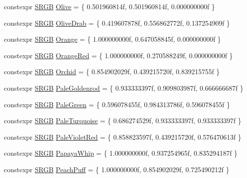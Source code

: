 \begin{DoxyCompactItemize}
\item 
constexpr \hyperlink{structmage_1_1_s_r_g_b}{S\+R\+GB} \hyperlink{namespacemage_1_1color_a7acb7a37c622e61615f548587d6b427c}{Olive} = \{ 0.\+501960814f, 0.\+501960814f, 0.\+000000000f \}
\item 
constexpr \hyperlink{structmage_1_1_s_r_g_b}{S\+R\+GB} \hyperlink{namespacemage_1_1color_a151c92b265a81f3d8dd4eac81dc133ef}{Olive\+Drab} = \{ 0.\+419607878f, 0.\+556862772f, 0.\+137254909f \}
\item 
constexpr \hyperlink{structmage_1_1_s_r_g_b}{S\+R\+GB} \hyperlink{namespacemage_1_1color_aabcf43da8629ad2e50ccc9d89825e52f}{Orange} = \{ 1.\+000000000f, 0.\+647058845f, 0.\+000000000f \}
\item 
constexpr \hyperlink{structmage_1_1_s_r_g_b}{S\+R\+GB} \hyperlink{namespacemage_1_1color_a45f7b1033b0d4f2eda6a0b2e9bbdc203}{Orange\+Red} = \{ 1.\+000000000f, 0.\+270588249f, 0.\+000000000f \}
\item 
constexpr \hyperlink{structmage_1_1_s_r_g_b}{S\+R\+GB} \hyperlink{namespacemage_1_1color_af52662e157e6674b473007146e3c40f6}{Orchid} = \{ 0.\+854902029f, 0.\+439215720f, 0.\+839215755f \}
\item 
constexpr \hyperlink{structmage_1_1_s_r_g_b}{S\+R\+GB} \hyperlink{namespacemage_1_1color_a493db5a4fbb51a82bd265f376c6a5e7e}{Pale\+Goldenrod} = \{ 0.\+933333397f, 0.\+909803987f, 0.\+666666687f \}
\item 
constexpr \hyperlink{structmage_1_1_s_r_g_b}{S\+R\+GB} \hyperlink{namespacemage_1_1color_a14c756d3d980a36599956a1f8f208dd3}{Pale\+Green} = \{ 0.\+596078455f, 0.\+984313786f, 0.\+596078455f \}
\item 
constexpr \hyperlink{structmage_1_1_s_r_g_b}{S\+R\+GB} \hyperlink{namespacemage_1_1color_ab93738a4262f4ae816f55dfd79a68859}{Pale\+Turquoise} = \{ 0.\+686274529f, 0.\+933333397f, 0.\+933333397f \}
\item 
constexpr \hyperlink{structmage_1_1_s_r_g_b}{S\+R\+GB} \hyperlink{namespacemage_1_1color_a0338af060f5f8ddc72a2fbcd0ed0cb6f}{Pale\+Violet\+Red} = \{ 0.\+858823597f, 0.\+439215720f, 0.\+576470613f \}
\item 
constexpr \hyperlink{structmage_1_1_s_r_g_b}{S\+R\+GB} \hyperlink{namespacemage_1_1color_a3752b77f8a90782256f837ad98aca12b}{Papaya\+Whip} = \{ 1.\+000000000f, 0.\+937254965f, 0.\+835294187f \}
\item 
constexpr \hyperlink{structmage_1_1_s_r_g_b}{S\+R\+GB} \hyperlink{namespacemage_1_1color_aa6d4c863a4bef4fea1584b396f5efa3f}{Peach\+Puff} = \{ 1.\+000000000f, 0.\+854902029f, 0.\+725490212f \}

\end{DoxyCompactItemize}
